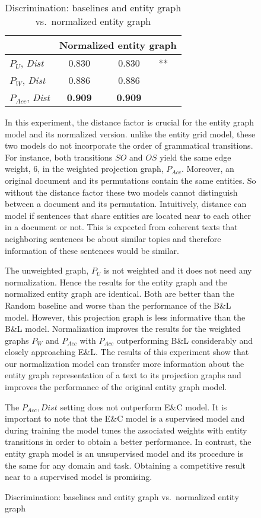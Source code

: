 \begin{figure}[!t]
\begin{table}[!t]
\begin{small}
\begin{tabular}{l|cc@{}l}
& \multicolumn{3}{|c}{Normalized entity graph} \\\hline 
$P_U$, \textit{Dist} & 0.830 & 0.830& ** \\
$P_W$, \textit{Dist} & 0.886 & 0.886&\\
$P_{Acc}$, \textit{Dist} & \textbf{0.909} & \textbf{0.909}&\\
\end{tabular}
\end{small}
\caption{Discrimination: baselines and entity graph vs.\ normalized
  entity graph}\label{t:exp1:sentence_ordering}  
\end{table}
%
In this experiment, the distance factor is crucial for the entity graph model and its normalized version. 
unlike the entity grid model, these two models do not incorporate the order of grammatical transitions. 
For instance, both transitions $S O$ and $O S$ yield the same edge weight, $6$, in the weighted projection graph, $P_{Acc}$. 
Moreover, an original document and its permutations contain the same entities. 
So without the distance factor these two models cannot distinguish between a document and its permutation. 
Intuitively, distance can model if sentences that share entities are located near to each other in a document or not. 
This is expected from coherent texts that neighboring sentences be about similar topics and therefore information of these sentences would be similar. 

The unweighted graph, $P_U$ is not weighted and it does not need any normalization.  
Hence the results for the entity graph and the normalized entity graph are identical.
Both are better than the Random baseline and worse than the performance of the B\&L model.
However, this projection graph is less informative than the B\&L model. 
Normalization improves the results for the weighted graphs $P_W$ and $P_{Acc}$ with $P_{Acc}$ outperforming B\&L
considerably and closely approaching E\&L. 
The results of this experiment show that our normalization model can transfer more information about the entity graph representation of a text to its projection graphs and improves the performance of the original entity graph model. 

The $P_{Acc}, Dist$ setting does not outperform E\&C model. 
It is important to note that the E\&C model is a supervised model and during training the model tunes the associated weights with entity transitions in order to obtain a better performance. 
In contrast, the entity graph model is an unsupervised model and its procedure is the same for any domain and task. 
Obtaining a competitive result near to a supervised model is promising.  



\end{figure}
